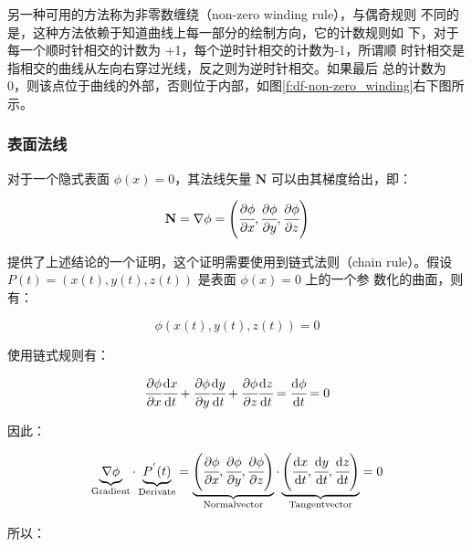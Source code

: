另一种可用的方法称为非零数缠绕（non-zero winding rule），与偶奇规则 不同的是，这种方法依赖于知道曲线上每一部分的绘制方向，它的计数规则如 下，对于每一个顺时针相交的计数为 +1，每个逆时针相交的计数为-1，所谓顺 时针相交是指相交的曲线从左向右穿过光线，反之则为逆时针相交。如果最后 总的计数为 0，则该点位于曲线的外部，否则位于内部，如图\ref{f:df-non-zero_winding}右下图所示。



\subsubsection{表面法线}
对于一个隐式表面 $\phi({x}) = 0$，其法线矢量 $\mathbf{N}$ 可以由其梯度给出，即：

\begin{equation}\label{e:df-normal}
	\mathbf{N}=\nabla\phi=\Biggl(\cfrac{\partial\phi}{\partial x},\cfrac{\partial\phi}{\partial y},\cfrac{\partial\phi}{\partial z}\Biggl)
\end{equation}

\cite{b:AnIntegratedIntroductiontoCG}提供了上述结论的一个证明，这个证明需要使用到链式法则（chain rule）。假设 $P (t) = (x(t), y(t), z(t))$ 是表面 $\phi({x}) = 0$ 上的一个参 数化的曲面，则有：

\begin{equation}
	\phi(x(t),y(t),z(t))=0
\end{equation}

\noindent 使用链式规则有：

\begin{equation}
	\cfrac{\partial\phi}{\partial x}\cfrac{{\rm d}x}{{\rm d}t}+\cfrac{\partial\phi}{\partial y}\cfrac{{\rm d}y}{{\rm d}t}+\cfrac{\partial\phi}{\partial z}\cfrac{{\rm d}z}{{\rm d}t}=\cfrac{{\rm d}\phi}{{\rm d}t}=0
\end{equation}

\noindent 因此：

\begin{equation}
	\underbrace{\nabla\phi}_{\rm Gradient}\cdot\underbrace{P^{'}(t)}_{\rm Derivate}=\underbrace{\Biggl(\cfrac{\partial\phi}{\partial x},\cfrac{\partial\phi}{\partial y},\cfrac{\partial\phi}{\partial z}\Biggl)}_{\rm Normal vector}\cdot\underbrace{\Biggl(\cfrac{{\rm d}x}{{\rm d}t},\cfrac{{\rm d}y}{{\rm d}t},\cfrac{{\rm d}z}{{\rm d}t}\Biggl)}_{\rm Tangent vector}=0
\end{equation}

\noindent 所以：

